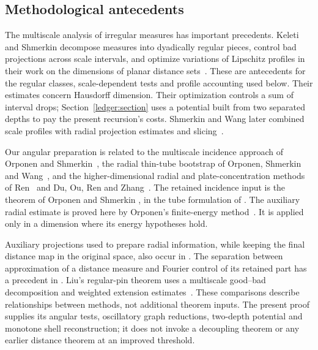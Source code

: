 \subsection{Methodological antecedents}

The multiscale analysis of irregular measures has important precedents.
Keleti and Shmerkin decompose measures into dyadically regular pieces,
control bad projections across scale intervals, and optimize variations
of Lipschitz profiles in their work on the dimensions of planar distance
sets~\cite[Corollary~3.5, Section~3.2 and Section~5]{KS2019}.
These are antecedents for the regular classes, scale-dependent tests and
profile accounting used below. Their estimates concern Hausdorff dimension.
Their optimization controls a sum of interval drops;
Section~\ref{ledger:section} uses a potential built from two separated
depths to pay the present recursion's costs.
Shmerkin and Wang later combined scale profiles with radial projection
estimates and slicing~\cite[Sections~5.5 and~6.1--6.3]{SW2025}.

Our angular preparation is related to the multiscale incidence approach
of Orponen and Shmerkin~\cite[Section~1.5]{OS2023}, the radial thin-tube
bootstrap of Orponen, Shmerkin and Wang~\cite[Section~1.3]{OSW2024},
and the higher-dimensional radial and plate-concentration methods
of Ren~\cite{Ren2023} and Du, Ou, Ren and Zhang~\cite{DORZ2024}.
The retained incidence input is the theorem of Orponen and Shmerkin
\cite[Theorem~1.3 and Remark~1.4]{OS2023}, in the tube formulation of
\cite[Definitions~2.5--2.6 and Theorem~2.7]{OSW2024}.
The auxiliary radial estimate is proved here by Orponen's finite-energy
method~\cite[Section~3 and the proof of Theorem~1.13]{Orponen2019}.
It is applied only in a dimension where its energy hypotheses hold.

Auxiliary projections used to prepare radial information, while keeping
the final distance map in the original space, also occur in
\cite[Sections~2--3]{DIOWZ2021}.
The separation between approximation of a distance measure and Fourier
control of its retained part has a precedent in
\cite[Propositions~2.1--2.2]{GIOW2020}.
Liu's regular-pin theorem uses a multiscale good--bad decomposition and
weighted extension estimates~\cite[Section~1.1]{Liu2026}.
These comparisons describe relationships between methods, not additional
theorem inputs. The present proof supplies its angular tests, oscillatory
graph reductions, two-depth potential and monotone shell reconstruction;
it does not invoke a decoupling theorem or any earlier distance theorem
at an improved threshold.

